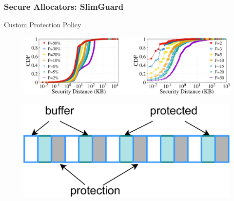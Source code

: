\documentclass[xcolor=table,bigger,unknownkeysallowed]{beamer}
\begin{document}
\begin{frame}
	\frametitle{Secure Allocators: SlimGuard} 
	\begin{block}{Custom Protection Policy}
		\begin{figure}	
			\centering
			\includegraphics[width=.7\columnwidth]{fig/policy_guan.png}
		\end{figure}
	\end{block}	
	\pause
	\begin{figure}	
		\centering
		\includegraphics[width=.3\columnwidth]{fig/policy_illustration.png}
	\end{figure}
\end{frame}
\end{document}
